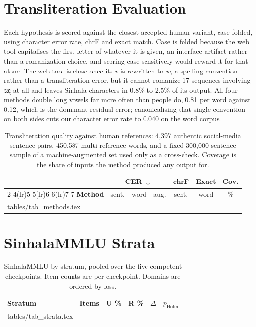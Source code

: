 \documentclass[11pt]{article}
\makeatletter
\newcommand{\si}[1]{{\sinhalafont #1}}
\newcommand{\rom}[1]{\textit{#1}}
\newcommand{\rows}[1]{\@@input #1 }
\makeatother
\begin{document}
\section{Transliteration Evaluation}
\label{sec:translit}

Each hypothesis is scored against the closest accepted human variant, case-folded, using
character error rate, chrF \citep{popovic-2015-chrf} and exact match.
Case is folded because the web tool capitalises the first letter of whatever it is
given, an interface artifact rather than a romanization choice, and scoring
case-sensitively would reward it for that alone. The web tool is close once its
\rom{v} is rewritten to \rom{w}, a spelling convention rather than a transliteration
error, but it cannot romanize 17 sequences involving \si{ඤ} at all and leaves Sinhala
characters in 0.8\% to 2.5\% of its output. All four methods double long vowels far
more often than people do, 0.81 per word against 0.12, which is the dominant residual
error; canonicalising that single convention on both sides cuts our character error
rate to 0.040 on the word corpus.

\begin{table}[h]
\centering\small
\setlength{\tabcolsep}{2.2pt}
\begin{tabular}{@{}lccccc c@{}}
\toprule
& \multicolumn{3}{c}{\textbf{CER} $\downarrow$} & \textbf{chrF} & \textbf{Exact} & \textbf{Cov.} \\
\cmidrule(lr){2-4}\cmidrule(lr){5-5}\cmidrule(lr){6-6}\cmidrule(lr){7-7}
\textbf{Method} & sent. & word & aug. & sent. & word & \% \\
\midrule
\rows{tables/tab_methods.tex}
\bottomrule
\end{tabular}
\caption{Transliteration quality against human references: 4{,}397 authentic
social-media sentence pairs, 450{,}587 multi-reference words, and a fixed
300{,}000-sentence sample of a machine-augmented set used only as a cross-check.
Coverage is the share of inputs the method produced any output for.}
\label{tab:methods}
\end{table}

\section{SinhalaMMLU Strata}
\label{sec:strata}

\begin{table}[h]
\centering\small
\setlength{\tabcolsep}{4pt}
\begin{tabular}{@{}lrrrrr@{}}
\toprule
\textbf{Stratum} & \textbf{Items} & \textbf{U \%} & \textbf{R \%}
& \boldmath$\Delta$ & \boldmath$p_{\text{Holm}}$ \\
\midrule
\rows{tables/tab_strata.tex}
\bottomrule
\end{tabular}
\caption{SinhalaMMLU by stratum, pooled over the five competent checkpoints. Item
counts are per checkpoint. Domains are ordered by loss.}
\label{tab:strata}
\end{table}
\end{document}
